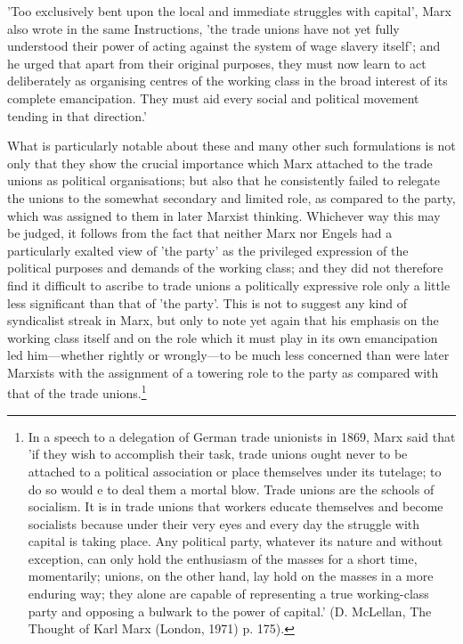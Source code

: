 'Too exclusively bent upon the local and immediate struggles with capital', Marx also wrote in the same Instructions, 'the trade unions have not yet fully understood their power of acting against the system of wage slavery itself'; and he urged that apart from their original purposes, they must now learn to act deliberately as organising centres of the working class in the broad interest of its complete emancipation. They must aid every social and political movement tending in that direction.'

What is particularly notable about these and many other such formulations is not only that they show the crucial importance which Marx attached to the trade unions as political organisations; but also that he consistently failed to relegate the unions to the somewhat secondary and limited role, as compared to the party, which was assigned to them in later Marxist thinking. Whichever way this may be judged, it follows from the fact that neither Marx nor Engels had a particularly exalted view of 'the party' as the privileged expression of the political purposes and demands of the working class; and they did not therefore find it difficult to ascribe to trade unions a politically expressive role only a little less significant than that of 'the party'. This is not to suggest any kind of syndicalist streak in Marx, but only to note yet again that his emphasis on the working class itself and on the role which it must play in its own emancipation led him—whether rightly or wrongly—to be much less concerned than were later Marxists with the assignment of a towering role to the party as compared with that of the trade unions.\footnote{In a speech to a delegation of German trade unionists in 1869, Marx said that 'if they wish to accomplish their task, trade unions ought never to be attached to a political association or place themselves under its tutelage; to do so would e to deal them a mortal blow. Trade unions are the schools of socialism. It is in trade unions that workers educate themselves and become socialists because under their very eyes and every day the struggle with capital is taking place. Any political party, whatever its nature and without exception, can only hold the enthusiasm of the masses for a short time, momentarily; unions, on the other hand, lay hold on the masses in a more enduring way; they alone are capable of representing a true working-class party and opposing a bulwark to the power of capital.' (D. McLellan, The Thought of Karl Marx (London, 1971) p. 175).}

